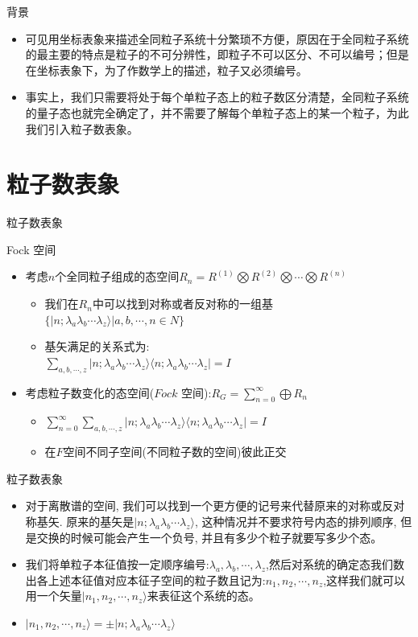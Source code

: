 \documentclass{beamer}
\begin{document}
\begin{frame}{背景}
	\begin{itemize}
		\item 可见用坐标表象来描述全同粒子系统十分繁琐不方便，原因在于全同粒子系统的最主要的特点是粒子的不可分辨性，即粒子不可以区分、不可以编号；但是在坐标表象下，为了作数学上的描述，粒子又必须编号。
		\item 事实上，我们只需要将处于每个单粒子态上的粒子数区分清楚，全同粒子系统的量子态也就完全确定了，并不需要了解每个单粒子态上的某一个粒子，为此我们引入粒子数表象。
	\end{itemize}
\end{frame}
	\section{粒子数表象}
	\begin{frame}{粒子数表象}
		\begin{block}{Fock 空间}
			\begin{itemize}
				\item 考虑$n$个全同粒子组成的态空间$R_{n}=R^{(1)}\bigotimes R^{(2)}\bigotimes\cdots\bigotimes R^{(n)}$
				\begin{itemize}
					\item 我们在$R_{n}$中可以找到对称或者反对称的一组基$\{|n;\lambda_{a}\lambda_{b}\cdots\lambda_{z}\rangle|a,b,\cdots,n\in N\}$
					\item 基矢满足的关系式为:\\$\sum\limits_{a,b,\cdots,z}|n;\lambda_{a}\lambda_{b}\cdots\lambda_{z}\rangle\langle n;\lambda_{a}\lambda_{b}\cdots\lambda_{z}|=I$
				\end{itemize}
			\item 考虑粒子数变化的态空间($Fock$ 空间):$R_{G}=\sum\limits_{n=0}^{\infty}\bigoplus R_{n}$
			\begin{itemize}
				\item $\sum\limits_{n=0}^{\infty}\sum\limits_{a,b,\cdots,z}|n;\lambda_{a}\lambda_{b}\cdots\lambda_{z}\rangle\langle n;\lambda_{a}\lambda_{b}\cdots\lambda_{z}|=I$
				\item 在$F$空间不同子空间(不同粒子数的空间)彼此正交
			\end{itemize}
			\end{itemize}
		\end{block}
	\end{frame}
	\begin{frame}{粒子数表象}
		\begin{itemize}
			\item 对于离散谱的空间, 我们可以找到一个更方便的记号来代替原来的对称或反对称基矢. 原来的基矢是$|n;\lambda_{a}\lambda_{b}\cdots\lambda_{z}\rangle$, 这种情况并不要求符号内态的排列顺序, 但是交换的时候可能会产生一个负号, 并且有多少个粒子就要写多少个态。
			\item 我们将单粒子本征值按一定顺序编号:$\lambda_{a},\lambda_{b},\cdots,\lambda_{z}$,然后对系统的确定态我们数出各上述本征值对应本征子空间的粒子数且记为:$n_{1},n_{2},\cdots,n_{z}$,这样我们就可以用一个矢量$|n_{1},n_{2},\cdots,n_{z}\rangle$来表征这个系统的态。
			\item $|n_{1},n_{2},\cdots,n_{z}\rangle=\pm |n;\lambda_{a}\lambda_{b}\cdots\lambda_{z}\rangle$
		\end{itemize}
		\end{frame}
\end{document}
